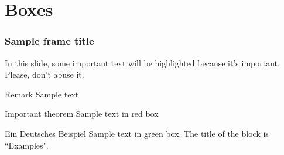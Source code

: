 \section{Boxes}
\begin{frame}
\frametitle{Sample frame title}

In this slide, some important text will be
\alert{highlighted} because it's important.
Please, don't abuse it.

\begin{block}{Remark}
Sample text
\end{block}

\begin{alertblock}{Important theorem}
Sample text in red box
\end{alertblock}

\begin{exampleblock}{Ein Deutsches Beispiel}
Sample text in green box. The title of the block is ``Examples".
\end{exampleblock}
\end{frame}